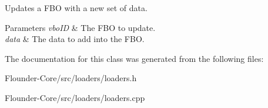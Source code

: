 Updates a F\+BO with a new set of data. 


\begin{DoxyParams}{Parameters}
{\em vbo\+ID} & The F\+BO to update. \\
\hline
{\em data} & The data to add into the F\+BO. \\
\hline
\end{DoxyParams}


The documentation for this class was generated from the following files\+:\begin{DoxyCompactItemize}
\item 
Flounder-\/\+Core/src/loaders/loaders.\+h\item 
Flounder-\/\+Core/src/loaders/loaders.\+cpp\end{DoxyCompactItemize}
